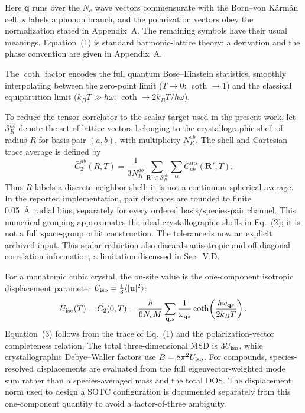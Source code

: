 \documentclass[aps,prb,reprint,amsmath,amssymb,floatfix]{revtex4-2}
\begin{document}
\color{revisionblue}
Here \(\mathbf q\) runs over the \(N_c\) wave vectors commensurate with the
Born--von K\'arm\'an cell, \(s\) labels a phonon branch, and the polarization
vectors obey the normalization stated in Appendix~A. The remaining symbols
have their usual meanings. Equation~(1) is standard harmonic-lattice theory;
a derivation and the phase convention are given in Appendix~A.
\color{black}

\color{revisionblue}
The \(\coth\) factor encodes the full quantum Bose--Einstein statistics,
smoothly interpolating between the zero-point limit (\(T\to 0\):
\(\coth\to 1\)) and the classical equipartition limit
(\(k_BT\gg\hbar\omega\): \(\coth\to 2k_BT/\hbar\omega\)).
\color{black}

\color{revisionblue}
To reduce the tensor correlator to the scalar target used in the present
work, let \(\mathcal S_R^{ab}\) denote the set of lattice vectors
belonging to the crystallographic shell of radius \(R\) for basis pair
\((a,b)\), with multiplicity \(N_R^{ab}\). The shell and Cartesian trace
average is defined by
\begin{equation}
\bar C_2^{ab}(R,T)=\frac{1}{3N_R^{ab}}
\sum_{\mathbf R'\in\mathcal S_R^{ab}}\sum_{\alpha}
C_{ab}^{\alpha\alpha}(\mathbf R',T).
\end{equation}
Thus \(R\) labels a discrete neighbor shell; it is not a continuum spherical
average. In the reported implementation, pair distances are rounded to finite
0.05~\AA\ radial bins, separately for every ordered basis/species-pair channel.
This numerical grouping approximates the ideal crystallographic shells in
Eq.~(2); it is not a full space-group orbit construction. The tolerance is now
an explicit archived input. This scalar reduction also discards anisotropic and
off-diagonal correlation information, a limitation discussed in Sec.~V.D.
\color{black}

\color{revisionblue}
For a monatomic cubic crystal, the on-site value is the one-component
isotropic displacement parameter
\(U_{\rm iso}=\frac13\langle|\mathbf u|^2\rangle\):
\begin{equation}
U_{\rm iso}(T)=\bar C_2(0,T)=
\frac{\hbar}{6N_cM}\sum_{\mathbf q,s}
\frac{1}{\omega_{\mathbf q s}}
\coth\!\left(\frac{\hbar\omega_{\mathbf q s}}{2k_BT}\right).
\end{equation}
Equation~(3) follows from the trace of Eq.~(1) and the polarization-vector
completeness relation. The total three-dimensional MSD is
\(3U_{\rm iso}\), while crystallographic Debye--Waller factors use
\(B=8\pi^2U_{\rm iso}\). For compounds, species-resolved displacements are
evaluated from the full eigenvector-weighted mode sum rather than a
species-averaged mass and the total DOS. The displacement norm used to design
a SOTC configuration is documented separately from this one-component
quantity to avoid a factor-of-three ambiguity.
\color{black}
\end{document}

